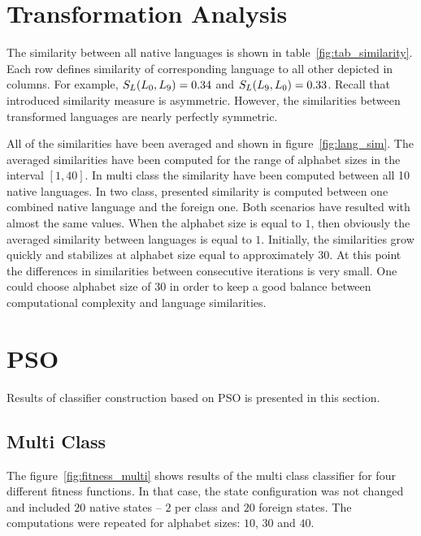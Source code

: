 \documentclass{mini}
\begin{document}
\section{Transformation Analysis}

The similarity between all native languages is shown in table~\ref{fig:tab_similarity}. Each row defines similarity of corresponding language to all other depicted in columns. For example, $S_{L}(L_0,L_9) = 0.34$ and $S_{L}(L_9,L_0) = 0.33$. Recall that introduced similarity measure is asymmetric. However, the similarities between transformed languages are nearly perfectly symmetric.

\makeTableMutualSimilarites

All of the similarities have been averaged and shown in figure~\ref{fig:lang_sim}. The averaged similarities have been computed for the range of alphabet sizes in the interval $[1, 40]$. In multi class the similarity have been computed between all 10 native languages. In two class, presented similarity is computed between one combined native language and the foreign one. Both scenarios have resulted with almost the same values. When the alphabet size is equal to $1$, then obviously the averaged similarity between languages is equal to $1$. Initially, the similarities grow quickly and stabilizes at alphabet size equal to approximately $30$. At this point the differences in similarities between consecutive iterations is very small. One could choose alphabet size of $30$ in order to keep a good balance between computational complexity and language similarities.

\makeFigureAvgSimlarity


\section{PSO}

Results of classifier construction based on PSO is presented in this section.

\subsection{Multi Class}

The figure~\ref{fig:fitness_multi} shows results of the multi class classifier for four different fitness functions. In that case, the state configuration was not changed and included $20$ native states -- $2$ per class and $20$ foreign states. The computations were repeated for alphabet sizes: $10$, $30$ and $40$.
\end{document}
